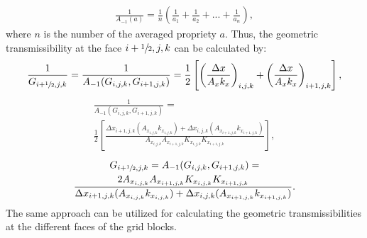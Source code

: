 \begin{align}
\label{geofactor1}
\frac{1}{A_{-1}(a)}=\frac{1}{n}\left(\frac{1}{a_1}+\frac{1}{a_2}+...+\frac{1}{a_n}\right),
\end{align}
where $n$ is the number of the averaged propriety $a$. Thus, the geometric transmissibility at the face $i+\sfrac{1}{2},j,k$ can be calculated by:
\begin{align}
\label{geofactor2}
\frac{1}{G_{i+\sfrac{1}{2},j,k}} = \frac{1}{A_{-1}(G_{i,j,k},G_{i+ 1,j,k})}=\frac{1}{2}\left[\left(\frac{\Delta x}{A_x k_x}\right)_{i,j,k}+\left(\frac{\Delta x}{A_x k_x}\right)_{i + 1,j,k}\right],
\end{align}
\begin{multline}
\label{geofactor3}
\frac{1}{A_{-1}(G_{i,j,k},G_{i+ 1,j,k})}=\\\frac{1}{2}\left[\frac{
\Delta x_{i + 1,j,k}(A_{x_{i,j,k}}k_{x_{i,j,k}})+\Delta x_{i,j,k}(A_{x_{i + 1,j,k}}k_{x_{i + 1,j,k}})}{A_{x_{i,j,k}}A_{x_{i + 1,j,k}}K_{x_{i,j,k}}K_{x_{i + 1,j,k}}}\right],
\end{multline}
\begin{multline}
\label{geofactor4}
G_{i+ \sfrac{1}{2},j,k}=A_{-1}(G_{i,j,k},G_{i+ 1,j,k})=\\\frac{2 A_{x_{i,j,k}}A_{x_{i + 1,j,k}}K_{x_{i,j,k}}K_{x_{i + 1,j,k}}}{
	\Delta x_{i + 1,j,k}(A_{x_{i,j,k}}k_{x_{i,j,k}})+\Delta x_{i,j,k}(A_{x_{i + 1,j,k}}k_{x_{i + 1,j,k}})}.
\end{multline}
The same approach can be utilized for calculating the geometric transmissibilities at the different faces of the grid blocks. 


